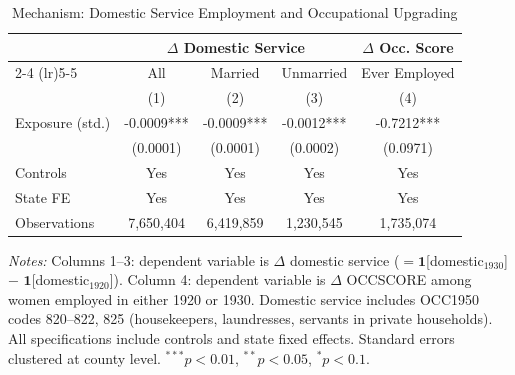 \begin{table}[htbp]
\centering
\caption{Mechanism: Domestic Service Employment and Occupational Upgrading}
\label{tab:mechanism}
\begin{tabular}{lcccc}
\hline\hline
 & \multicolumn{3}{c}{$\Delta$ Domestic Service} & $\Delta$ Occ. Score \\
\cmidrule(lr){2-4} \cmidrule(lr){5-5}
 & All & Married & Unmarried & Ever Employed \\
 & (1) & (2) & (3) & (4) \\
\hline
Exposure (std.) & -0.0009*** & -0.0009*** & -0.0012*** & -0.7212*** \\
 & (0.0001) & (0.0001) & (0.0002) & (0.0971) \\
\hline
Controls & Yes & Yes & Yes & Yes \\
State FE & Yes & Yes & Yes & Yes \\
Observations & 7,650,404 & 6,419,859 & 1,230,545 & 1,735,074 \\
\hline\hline
\end{tabular}
\begin{tablenotes}[flushleft]
\small
\item \textit{Notes:} Columns 1--3: dependent variable is $\Delta$ domestic service ($= \mathbf{1}$[domestic$_{1930}$] $-$ $\mathbf{1}$[domestic$_{1920}$]). Column 4: dependent variable is $\Delta$ OCCSCORE among women employed in either 1920 or 1930. Domestic service includes OCC1950 codes 820--822, 825 (housekeepers, laundresses, servants in private households). All specifications include controls and state fixed effects. Standard errors clustered at county level. $^{***}p<0.01$, $^{**}p<0.05$, $^{*}p<0.1$.
\end{tablenotes}
\end{table}
